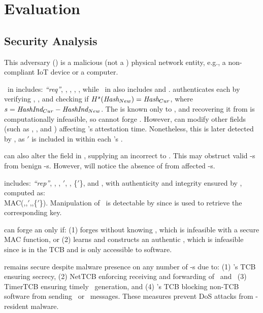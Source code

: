 \section{Evaluation \label{eval}}

\subsection{Security Analysis} \label{subsec:security-analysis}

This adversary (\sadv) is a malicious (not a \system{} \prv) physical network entity, e.g., a non-compliant IoT device or a computer. 

\Attreq\ in \trapsrtc includes: \textit{``req''}, \snd, \hash, \hashind, \attesttime, while \Attreq\ in \trapsnortc also includes \height{} and \netheight. \prv authenticates each \Attreq{} by verifying \hashind, \attesttime, and checking if $H^s(\textit{Hash$_{New}$}) = \textit{Hash$_{Cur}$}$, where $s=\textit {HashInd$_{Cur}$}-\textit {HashInd$_{New}$}$. The \hash{} is known only to \vrf, and recovering it from \curhash{} is computationally infeasible, so \sadv cannot forge \hash. However, \sadv can modify other fields (such as \attesttime, \height, and \netheight) affecting \prv's attestation time. Nonetheless, this is later detected by \vrf, as \attesttime$'$ is included in \Authrep{} within each \prv's \Attrep.

\sadv can also alter the \snd{} field in \Attreq{}, supplying an incorrect \parent{} to \prv. This may obstruct valid \Attrep-s from benign \prv-s. However, \vrf will notice the absence of \Attrep{} from affected \prv-s.

\Attrep{} includes: \textit{``rep''}, \devid, \parent, \attesttime$'$, \hash, \{\lmt$'$\}, and \Authrep, with authenticity and integrity ensured by \Authrep, computed as:\\ MAC(\key,\parent,\attesttime$'$,\hash,\{\lmt$'$\}). Manipulation of \devid\ is detectable by \vrf since \devid is used to retrieve the corresponding key.

\sadv can forge an \Attrep{} only if: (1) \sadv forges \Authrep{} without knowing \key, which is infeasible with a secure MAC function, or (2) \sadv learns \key and constructs an authentic \Authrep{}, which is infeasible since \key is in the TCB and is only accessible to \system software.

\system remains secure despite malware presence on any number of \prv-s due to: (1) \prv's TCB ensuring \key secrecy, (2) NetTCB enforcing receiving and forwarding of \Attreq\ and \Attrep\, (3) TimerTCB ensuring timely \Attrep\ generation, and (4) \prv's TCB blocking non-TCB software from sending \Attrep\ or \Attreq\ messages. These measures prevent DoS attacks from \prv-resident malware.

